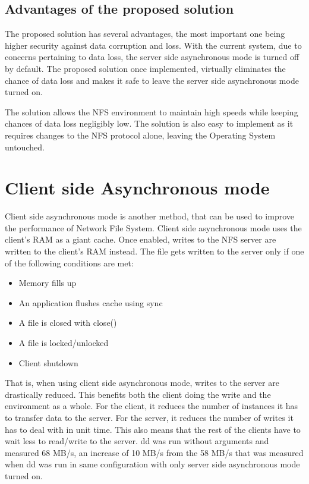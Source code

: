 \documentclass[conference]{IEEEtran}
\begin{document}
\subsection{Advantages of the proposed solution}
The proposed solution has several advantages, the most important one
being higher security against data corruption and loss. With the current 
system, due to concerns pertaining to data loss, the server side
asynchronous mode is turned off by default. The proposed solution once
implemented, virtually eliminates the chance of data loss and makes it safe
to leave the server side asynchronous mode turned on.

The solution allows the NFS environment to maintain high speeds while
keeping chances of data loss negligibly low. The solution is also easy to
implement as it requires changes to the NFS protocol alone, leaving the
Operating System untouched.

\section{Client side Asynchronous mode}
Client side asynchronous mode is another method, that can be used to improve
the performance of Network File System. Client side asynchronous mode uses
the client's RAM as a giant cache. Once enabled, writes to the NFS server
are written to the client's RAM instead. The file gets written to the server 
only if one of the following conditions are met:
\begin{itemize}
\item Memory fills up
\item An application flushes cache using sync
\item A file is closed with close()
\item A file is locked/unlocked
\item Client shutdown
\end{itemize}

That is, when using client side asynchronous mode, writes to the server are
drastically reduced. This benefits both the client doing the write and the
environment as a whole. For the client, it reduces the number of instances
it has to transfer data to the server. For the server, it reduces the
number of writes it has to deal with in unit time. This also means that the
rest of the clients have to wait less to read/write to the server. dd was
run without arguments and measured 68 MB/s, an increase of 10 MB/s from the
58 MB/s that was measured when dd was run in same configuration with only
server side asynchronous mode turned on.
\end{document}
